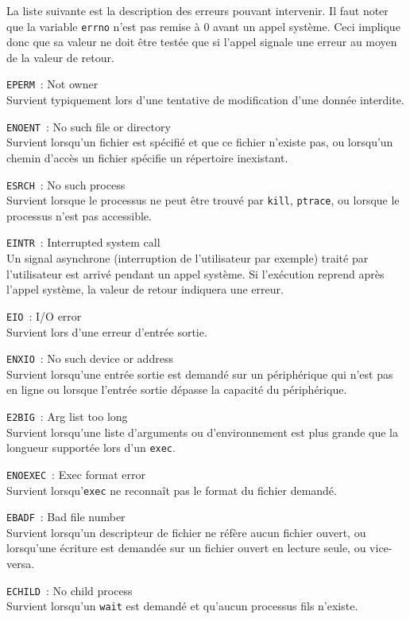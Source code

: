 \documentclass [twoside] {report}
\begin{document}
La liste suivante est la description
des erreurs pouvant intervenir. Il faut noter que
la variable {\tt errno} n'est pas remise à 0 avant un
appel système. Ceci implique donc que sa valeur ne
doit être testée que si l'appel signale une
erreur au moyen de la valeur de retour.

{\tt EPERM}~: Not owner \\
Survient typiquement lors d'une
tentative de modification d'une donnée interdite.

{\tt ENOENT}~: No such file or directory \\
Survient lorsqu'un fichier est spécifié et que ce
fichier n'existe pas, ou lorsqu'un chemin d'accès
un fichier spécifie un répertoire inexistant.

{\tt ESRCH}~: No such process \\
Survient lorsque le processus ne peut être trouvé
par {\tt kill}, {\tt ptrace}, ou lorsque le processus
n'est pas accessible.

{\tt EINTR}~: Interrupted system call \\
Un signal asynchrone (interruption de
l'utilisateur par exemple) traité par
l'utilisateur est arrivé pendant un appel système.
Si l'exécution reprend après l'appel système, la
valeur de retour indiquera une erreur.

{\tt EIO}~: I/O error \\
Survient lors d'une erreur d'entrée sortie.

{\tt ENXIO}~: No such device or address \\
Survient lorsqu'une entrée sortie est demandé sur
un périphérique qui n'est pas en ligne ou lorsque
l'entrée sortie dépasse la capacité du
périphérique.

{\tt E2BIG}~: Arg list too long \\
Survient lorsqu'une liste d'arguments ou
d'environnement est plus grande que la longueur
supportée lors d'un {\tt exec}.

{\tt ENOEXEC}~: Exec format error \\
Survient lorsqu'{\tt exec} ne reconnaît pas le
format du fichier demandé.

{\tt EBADF}~: Bad file number \\
Survient lorsqu'un descripteur de fichier ne
réfère aucun fichier ouvert, ou lorsqu'une
écriture est demandée sur un fichier ouvert en
lecture seule, ou vice-versa.

{\tt ECHILD}~: No child process \\
Survient lorsqu'un {\tt wait} est demandé et
qu'aucun processus fils n'existe.
\end{document}
